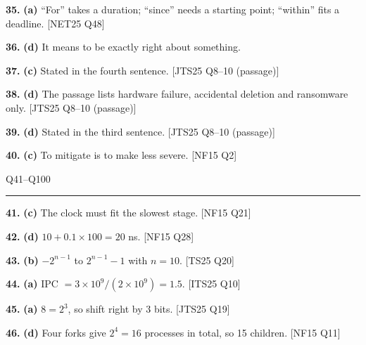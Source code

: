 \documentclass[11pt,a4paper]{article}
\newcommand{\sect}[2]{\vspace{8pt}{\large\bfseries\color{ember}#1}\hfill{\small\color{slate}#2}\par
{\color{slate}\hrule}\vspace{6pt}}
\begin{document}
\noindent\textbf{35.} \textbf{(a)} ``For'' takes a duration; ``since'' needs a starting point; ``within'' fits a deadline. {\color{ember}\scriptsize[NET25 Q48]}\par\vspace{3pt}
\noindent\textbf{36.} \textbf{(d)} It means to be exactly right about something.\par\vspace{3pt}
\noindent\textbf{37.} \textbf{(c)} Stated in the fourth sentence. {\color{ember}\scriptsize[JTS25 Q8--10 (passage)]}\par\vspace{3pt}
\noindent\textbf{38.} \textbf{(d)} The passage lists hardware failure, accidental deletion and ransomware only. {\color{ember}\scriptsize[JTS25 Q8--10 (passage)]}\par\vspace{3pt}
\noindent\textbf{39.} \textbf{(d)} Stated in the third sentence. {\color{ember}\scriptsize[JTS25 Q8--10 (passage)]}\par\vspace{3pt}
\noindent\textbf{40.} \textbf{(c)} To mitigate is to make less severe. {\color{ember}\scriptsize[NF15 Q2]}\par\vspace{3pt}
\normalsize\sect{Part B}{Q41--Q100}\small
\noindent\textbf{41.} \textbf{(c)} The clock must fit the slowest stage. {\color{ember}\scriptsize[NF15 Q21]}\par\vspace{3pt}
\noindent\textbf{42.} \textbf{(d)} $10+0.1\times100=20$ ns. {\color{ember}\scriptsize[NF15 Q28]}\par\vspace{3pt}
\noindent\textbf{43.} \textbf{(b)} $-2^{n-1}$ to $2^{n-1}-1$ with $n=10$. {\color{ember}\scriptsize[TS25 Q20]}\par\vspace{3pt}
\noindent\textbf{44.} \textbf{(a)} IPC $=3\times10^9/(2\times10^9)=1.5$. {\color{ember}\scriptsize[ITS25 Q10]}\par\vspace{3pt}
\noindent\textbf{45.} \textbf{(a)} $8=2^3$, so shift right by 3 bits. {\color{ember}\scriptsize[JTS25 Q19]}\par\vspace{3pt}
\noindent\textbf{46.} \textbf{(d)} Four forks give $2^4=16$ processes in total, so 15 children. {\color{ember}\scriptsize[NF15 Q11]}\par\vspace{3pt}
\end{document}
